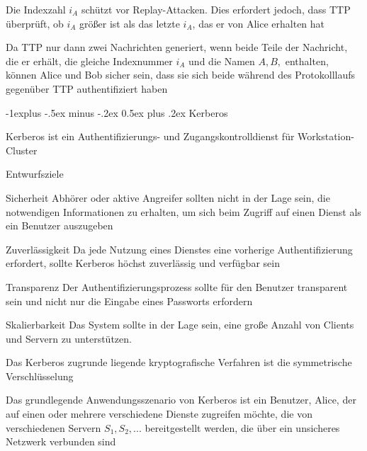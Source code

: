 \documentclass[a4paper]{article}
\makeatletter
\renewcommand{\subsection}{\@startsection{subsection}{2}{0mm}%
 {-1explus -.5ex minus -.2ex}%
 {0.5ex plus .2ex}%
 {\normalfont\normalsize\bfseries}}
\makeatother
\begin{document}
\begin{multicols}{3}
\begin{itemize*}
            \item Die Indexzahl $i_A$ schützt vor Replay-Attacken. Dies erfordert jedoch, dass TTP überprüft, ob $i_A$ größer ist als das letzte $i_A$, das er von Alice erhalten hat
            \item Da TTP nur dann zwei Nachrichten generiert, wenn beide Teile der Nachricht, die er erhält, die gleiche Indexnummer $i_A$ und die Namen $A, B,$ enthalten, können Alice und Bob sicher sein, dass sie sich beide während des Protokolllaufs gegenüber TTP authentifiziert haben
      \end{itemize*}

      \subsection{Kerberos}
      \begin{itemize*}
            \item Kerberos ist ein Authentifizierungs- und Zugangskontrolldienst für Workstation-Cluster
            \item Entwurfsziele
            \begin{description*}
                  \item[Sicherheit] Abhörer oder aktive Angreifer sollten nicht in der Lage sein, die notwendigen Informationen zu erhalten, um sich beim Zugriff auf einen Dienst als ein Benutzer auszugeben
                  \item[Zuverlässigkeit] Da jede Nutzung eines Dienstes eine vorherige Authentifizierung erfordert, sollte Kerberos höchst zuverlässig und verfügbar sein
                  \item[Transparenz] Der Authentifizierungsprozess sollte für den Benutzer transparent sein und nicht nur die Eingabe eines Passworts erfordern
                  \item[Skalierbarkeit] Das System sollte in der Lage sein, eine große Anzahl von Clients und Servern zu unterstützen.
            \end{description*}
            \item Das Kerberos zugrunde liegende kryptografische Verfahren ist die symmetrische Verschlüsselung %
            \item Das grundlegende Anwendungsszenario von Kerberos ist ein Benutzer, Alice, der auf einen oder mehrere verschiedene Dienste zugreifen möchte, die von verschiedenen Servern $S_1, S_2, ...$ bereitgestellt werden, die über ein unsicheres Netzwerk verbunden sind

\end{itemize*}
\end{multicols}
\end{document}
